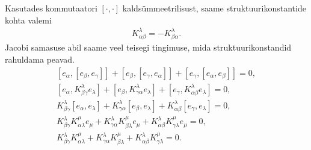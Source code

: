 Kasutades kommutaatori $[\cdot, \cdot]$ kaldsümmeetrilisust, saame
struktuurikonstantide kohta valemi
\begin{align}\label{om:str-konst-kald-symm}
    K_{\alpha \beta}^{\lambda} = -K_{\beta \alpha}^{\lambda}.
\end{align}
Jacobi samasuse abil saame veel teisegi tingimuse, mida struktuurikonstandid
rahuldama peavad.
\begin{align*}
    \left[e_\alpha, \left[ e_\beta, e_\gamma \right] \right] +
    \left[e_\beta, \left[ e_\gamma, e_\alpha \right] \right] +
    \left[e_\gamma, \left[ e_\alpha, e_\beta \right] \right] = 0, \\
    \left[e_\alpha, K_{\beta \gamma}^{\lambda} e_\lambda \right] +
    \left[e_\beta, K_{\gamma \alpha}^{\lambda} e_\lambda \right] +
    \left[e_\gamma, K_{\alpha \beta}^{\lambda} e_\lambda \right] = 0, \\
    K_{\beta \gamma}^{\lambda} \left[e_\alpha, e_\lambda \right] +
    K_{\gamma \alpha}^{\lambda} \left[e_\beta, e_\lambda \right] +
    K_{\alpha \beta}^{\lambda} \left[e_\gamma, e_\lambda \right] = 0, \\
    K_{\beta \gamma}^{\lambda} K_{\alpha \lambda}^{\mu} e_{\mu} +
    K_{\gamma \alpha}^{\lambda} K_{\beta \lambda}^{\mu} e_{\mu} +
    K_{\alpha \beta}^{\lambda} K_{\gamma \lambda}^{\mu} e_{\mu} = 0, \\
    K_{\beta \gamma}^{\lambda} K_{\alpha \lambda}^{\mu} +
    K_{\gamma \alpha}^{\lambda} K_{\beta \lambda}^{\mu} +
    K_{\alpha \beta}^{\lambda} K_{\gamma \lambda}^{\mu} = 0.
\end{align*}

